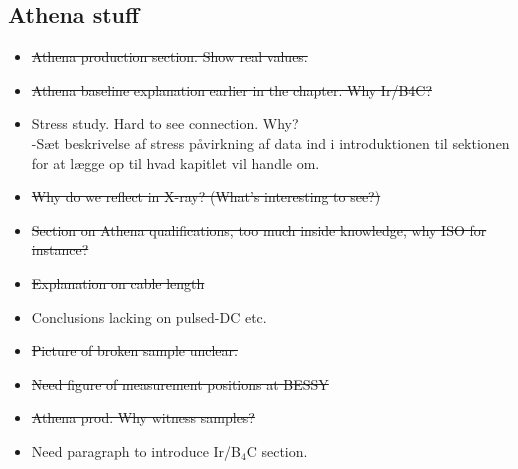 \subsection{Athena stuff}
\begin{itemize}

	\item \st{ Athena production section. Show real values.}
	\item \st{Athena baseline explanation earlier in the chapter. Why Ir/B4C?}
	\item Stress study. Hard to see connection. Why?\\
      -Sæt beskrivelse af stress påvirkning af data ind i introduktionen til sektionen for at lægge op til hvad kapitlet vil handle om.
	\item \st{Why do we reflect in X-ray? (What's interesting to see?)}\\

	\item \st{Section on Athena qualifications, too much inside knowledge, why ISO for instance?}\\

	\item \st{Explanation on cable length}
	\item Conclusions lacking on pulsed-DC etc.
	\item \st{Picture of broken sample unclear.}
	\item \st{Need figure of measurement positions at BESSY}
	\item \st{Athena prod. Why witness samples?}
  \item Need paragraph to introduce Ir/B$_4$C section.

\end{itemize}

